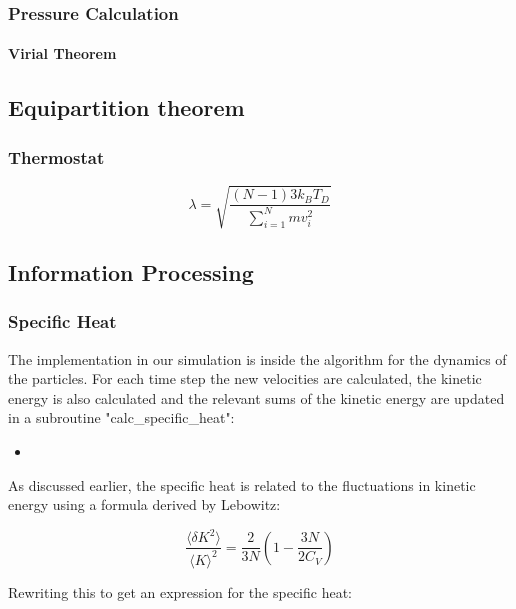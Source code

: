 \documentclass[
10pt, %
a4paper, %
oneside, %
headinclude,footinclude, %
BCOR5mm, %
]{scrartcl}
\newcommand{\insertcode}[2]{\begin{itemize}\item[]\end{itemize}} %
\begin{document}
\subsubsection{Pressure Calculation}

\paragraph{Virial Theorem}

\subsection{Equipartition theorem}

\subsubsection{Thermostat}


$$ \lambda = \sqrt{ \frac{(N-1) 3 k_BT_D}{ \sum_{i=1}^N mv_i^2} } $$





\subsection{Information Processing}

\subsubsection{Specific Heat}

The implementation in our simulation is inside the algorithm for the dynamics of the particles. For each time step the new velocities are calculated, the kinetic energy is also calculated and the relevant sums of the kinetic energy are updated in a subroutine "calc\_specific\_heat":

\insertcode{"Scripts/specific_heat_snippet_1.f90"}{Updating the relevant sums of the kinetic energy} %

\noindent
As discussed earlier, the specific heat is related to the fluctuations in kinetic energy using a formula derived by Lebowitz\cite{Duane:1985lz}:

$$ \frac{\langle\delta K^2\rangle}{\langle K\rangle^2} = \frac{2}{3N} \left ( 1 - \frac{3N}{2C_V} \right ) $$

\noindent
Rewriting this to get an expression for the specific heat:
\end{document}
